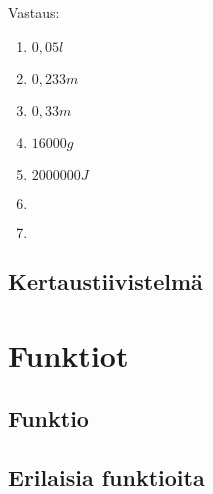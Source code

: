 \begin{tehtava}
\begin{vastaus}
Vastaus:
\begin{enumerate}
\item $0,05 l$
\item $0,233 m$
\item $0,33 m$
\item $16 000 g$
\item $2 000 000 J$
\item $ $
\item $ $
\end{enumerate}
\end{vastaus}
\end{tehtava}


\chapter{Kertaustiivistelmä}

\part{Funktiot}
\chapter{Funktio}
\chapter{Erilaisia funktioita}